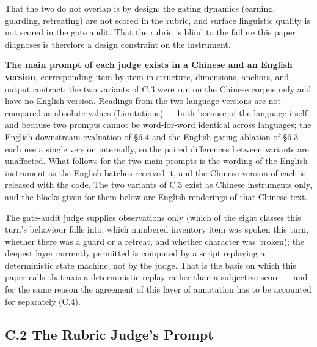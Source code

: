 \documentclass[letterpaper]{article}
\begin{document}
That the two do not overlap is by design: the gating dynamics (earning, guarding, retreating) are not scored in the rubric, and surface linguistic quality is not scored in the gate audit. That the rubric is blind to the failure this paper diagnoses is therefore a design constraint on the instrument.

\textbf{The main prompt of each judge exists in a Chinese and an English version}, corresponding item by item in structure, dimensions, anchors, and output contract; the two variants of C.3 were run on the Chinese corpus only and have no English version. Readings from the two language versions are not compared as absolute values (Limitations) --- both because of the language itself and because two prompts cannot be word-for-word identical across languages; the English downstream evaluation of \S{}6.4 and the English gating ablation of \S{}6.3 each use a single version internally, so the paired differences between variants are unaffected. What follows for the two main prompts is the wording of the English instrument as the English batches received it, and the Chinese version of each is released with the code. The two variants of C.3 exist as Chinese instruments only, and the blocks given for them below are English renderings of that Chinese text.

The gate-audit judge supplies observations only (which of the eight classes this turn's behaviour falls into, which numbered inventory item was spoken this turn, whether there was a guard or a retreat, and whether character was broken); the deepest layer currently permitted is computed by a script replaying a deterministic state machine, not by the judge. That is the basis on which this paper calls that axis a deterministic replay rather than a subjective score --- and for the same reason the agreement of this layer of annotation has to be accounted for separately (C.4).


\subsection*{C.2 The Rubric Judge's Prompt}
\end{document}
